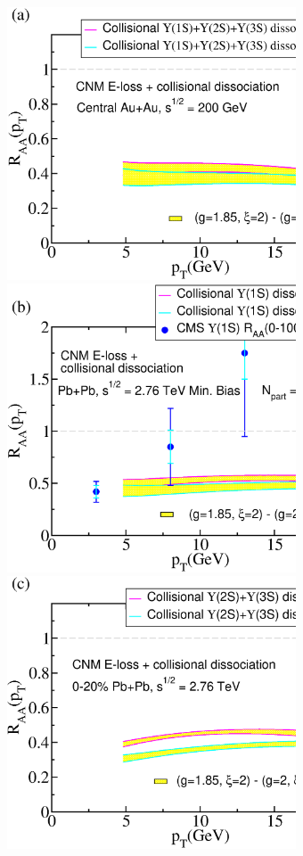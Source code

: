 \documentclass[article,showpacs,preprintnumbers,amsmath,amssymb]{revtex4}
\begin{document}
\begin{figure}[!t]
\vspace*{.2in}
\includegraphics[width=3.38in,angle=0]{fig12_rhic0200auaupsilon123.eps} 
\includegraphics[width=3.38in,angle=0]{fig13_lhc2760pbpbupsilonminbias.eps} 
\includegraphics[width=3.38in,angle=0]{fig14_lhc2760pbpbupsilon23.eps}  

\end{figure}
\end{document}
